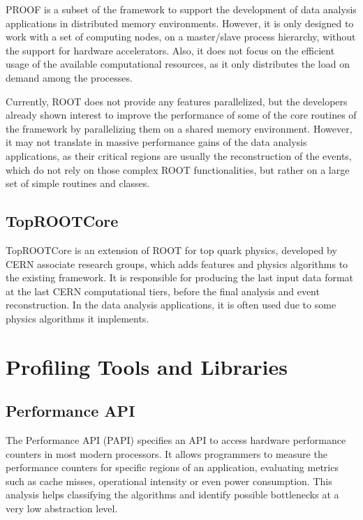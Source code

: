 PROOF is a subset of the framework to support the development of data analysis applications in distributed memory environments. However, it is only designed to work with a set of computing nodes, on a master/slave process hierarchy, without the support for hardware accelerators. Also, it does not focus on the efficient usage of the available computational resources, as it only distributes the load on demand among the processes.

Currently, ROOT does not provide any features parallelized, but the developers already shown interest to improve the performance of some of the core routines of the framework by parallelizing them on a shared memory environment. However, it may not translate in massive performance gains of the data analysis applications, as their critical regions are usually the reconstruction of the events, which do not rely on those complex ROOT functionalities, but rather on a large set of simple routines and classes.

\subsection*{TopROOTCore}

TopROOTCore is an extension of ROOT for top quark physics, developed by CERN associate research groups, which adds features and physics algorithms to the existing framework. It is responsible for producing the last input data format at the last CERN computational tiers, before the final analysis and event reconstruction. In the data analysis applications, it is often used due to some physics algorithms it implements.

\section{Profiling Tools and Libraries}
\label{tools}

\subsection*{Performance API}

The Performance API (PAPI) \cite{PAPI} specifies an API to access hardware performance counters in most modern processors. It allows programmers to measure the performance counters for specific regions of an application, evaluating metrics such as cache misses, operational intensity or even power consumption. This analysis helps classifying the algorithms and identify possible bottlenecks at a very low abstraction level.

